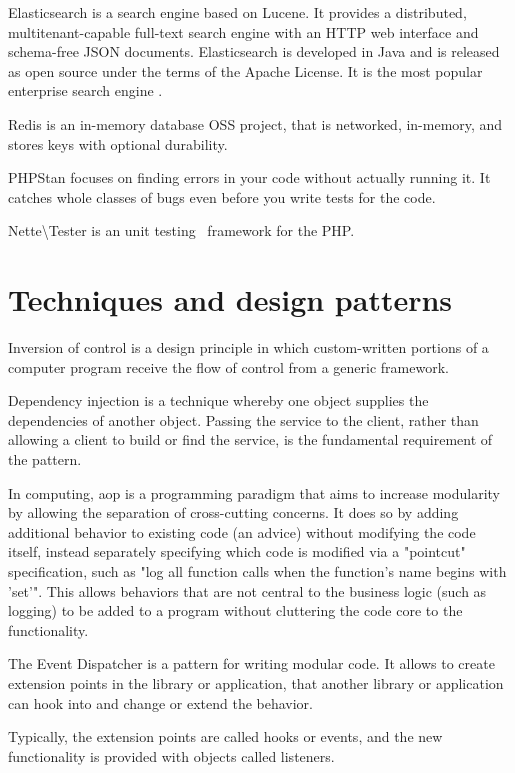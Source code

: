 Elasticsearch is a search engine based on Lucene. It provides a distributed, multitenant-capable full-text search engine with an HTTP web interface and schema-free JSON documents. Elasticsearch is developed in Java and is released as open source under the terms of the Apache License. It is the most popular enterprise search engine .~\cite{wiki:elasticsearch}

 \label{sec:theory:redis}

Redis is an in-memory database OSS project, that is networked, in-memory, and stores keys with optional durability.~\cite{wiki:redis}

 \label{sec:theory:phpstan}

PHPStan focuses on finding errors in your code without actually running it. It catches whole classes of bugs even before you write tests for the code.~\cite{github:phpstan}

 \label{sec:theory:nette-tester}

Nette\textbackslash{}Tester is an unit testing~\cite{wiki:unit-testing} framework for the PHP.~\cite{tester:docs}

\section{Techniques and design patterns}

 \label{sec:theory:di}

Inversion of control is a design principle in which custom-written portions of a computer program receive the flow of control from a generic framework.

Dependency injection is a technique whereby one object supplies the dependencies of another object. Passing the service to the client, rather than allowing a client to build or find the service, is the fundamental requirement of the pattern.~\cite{fowler:di}

 \label{sec:theory:aop}

In computing, \gls{aop} is a programming paradigm that aims to increase modularity by allowing the separation of cross-cutting concerns. It does so by adding additional behavior to existing code (an advice) without modifying the code itself, instead separately specifying which code is modified via a "pointcut" specification, such as "log all function calls when the function's name begins with 'set'". This allows behaviors that are not central to the business logic (such as logging) to be added to a program without cluttering the code core to the functionality.~\cite{wiki:aop}

 \label{sec:theory:event-dispatcher}

The Event Dispatcher is a pattern for writing modular code. It allows to create extension points in the library or application, that another library or application can hook into and change or extend the behavior.

Typically, the extension points are called hooks or events, and the new functionality is provided with objects called listeners.
